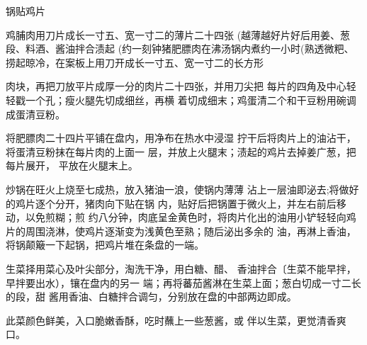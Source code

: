 \begin{recipe}{锅贴鸡片}

\ingredients


\cooking

\step 鸡脯肉用刀片成长一寸五、宽一寸二的薄片二十四张 (越薄越好片好后用姜、葱段、料酒、酱油拌合渍起 (约一刻钟猪肥膘肉在沸汤锅内煮约一小时(熟透微粑、 捞起晾冷，在案板上用刀开成长一寸五、宽一寸二的长方形

肉块，再把刀放平片成厚一分的肉片二十四张，并用刀尖把 每片的四角及中心轻轻戳一个孔；瘦火腿先切成细丝，再横 着切成细末；鸡蛋清二个和干豆粉用碗调成蛋清豆粉。

\step 将肥膘肉二十四片平铺在盘内，用净布在热水中浸湿 拧干后将肉片上的油沾干，将蛋清豆粉抹在每片肉的上面一 层，并放上火腿末；渍起的鸡片去掉姜广葱，把每片展开， 平放在火腿末上。

\step 炒锅在旺火上烧至七成热，放入猪油一浪，使锅内薄薄 沾上一层油即泌去;将做好的鸡片逐个分开，猪肉向下贴在锅 内，贴好后把锅置于微火上，并左右前后移动，以免煎糊；煎 约八分钟，肉底呈金黄色时，将肉片化出的油用小铲轻轻向鸡 片的周围浇淋，使鸡片逐渐变为浅黄色至熟；随后泌出多余的 油，再淋上香油，将锅颠簸一下起锅，把鸡片堆在条盘的一端。

\step 生菜择用菜心及叶尖部分，淘洗干净，用白糖、醋、 香油拌合〔生菜不能早拌，早拌要出水），镶在盘内的另一 端；再将蕃茄酱淋在生菜上面；葱白切成一寸二长的段，甜 酱用香油、白糖拌合调匀，分别放在盘的中部两边即成。

\notes

此菜颜色鲜美，入口脆嫩香酥，吃时蘸上一些葱酱，或 伴以生菜，更觉清香爽口。

\end{recipe}

